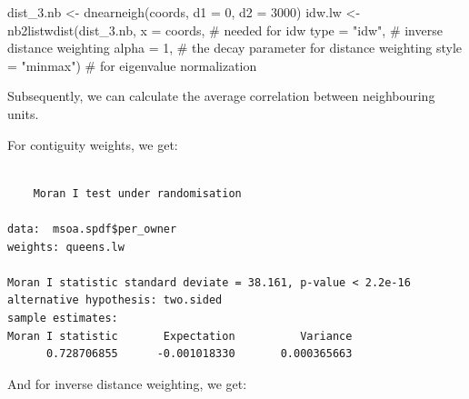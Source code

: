 \documentclass[
  letterpaper,
  DIV=11,
  numbers=noendperiod]{scrreprt}
\newenvironment{Shaded}{\begin{snugshade}}{\end{snugshade}}
\newcommand{\AttributeTok}[1]{\textcolor[rgb]{0.40,0.45,0.13}{#1}}
\newcommand{\CommentTok}[1]{\textcolor[rgb]{0.37,0.37,0.37}{#1}}
\newcommand{\DecValTok}[1]{\textcolor[rgb]{0.68,0.00,0.00}{#1}}
\newcommand{\FunctionTok}[1]{\textcolor[rgb]{0.28,0.35,0.67}{#1}}
\newcommand{\NormalTok}[1]{\textcolor[rgb]{0.00,0.23,0.31}{#1}}
\newcommand{\OtherTok}[1]{\textcolor[rgb]{0.00,0.23,0.31}{#1}}
\newcommand{\SpecialCharTok}[1]{\textcolor[rgb]{0.37,0.37,0.37}{#1}}
\newcommand{\StringTok}[1]{\textcolor[rgb]{0.13,0.47,0.30}{#1}}
\begin{document}
\begin{Shaded}
\begin{Highlighting}[]
\NormalTok{dist\_3.nb }\OtherTok{\textless{}{-}} \FunctionTok{dnearneigh}\NormalTok{(coords, }
                        \AttributeTok{d1 =} \DecValTok{0}\NormalTok{, }\AttributeTok{d2 =} \DecValTok{3000}\NormalTok{)}
\NormalTok{idw.lw }\OtherTok{\textless{}{-}} \FunctionTok{nb2listwdist}\NormalTok{(dist\_3.nb,}
                       \AttributeTok{x =}\NormalTok{ coords, }\CommentTok{\# needed for idw}
                       \AttributeTok{type =} \StringTok{"idw"}\NormalTok{, }\CommentTok{\# inverse distance weighting}
                       \AttributeTok{alpha =} \DecValTok{1}\NormalTok{, }\CommentTok{\# the decay parameter for distance weighting}
                       \AttributeTok{style =} \StringTok{"minmax"}\NormalTok{) }\CommentTok{\# for eigenvalue normalization}
\end{Highlighting}
\end{Shaded}

Subsequently, we can calculate the average correlation between
neighbouring units.

For contiguity weights, we get:

\begin{Shaded}
\end{Shaded}

\begin{verbatim}

    Moran I test under randomisation

data:  msoa.spdf$per_owner  
weights: queens.lw    

Moran I statistic standard deviate = 38.161, p-value < 2.2e-16
alternative hypothesis: two.sided
sample estimates:
Moran I statistic       Expectation          Variance 
      0.728706855      -0.001018330       0.000365663 
\end{verbatim}

And for inverse distance weighting, we get:

\begin{Shaded}
\end{Shaded}
\end{document}

